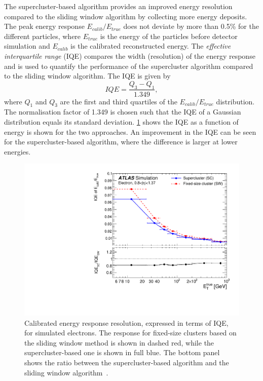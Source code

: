 The supercluster-based algorithm provides an improved energy resolution compared to the sliding window algorithm by collecting more energy deposits. The peak energy response $E_{calib}/E_{true}$ does not deviate by more than 0.5\% for the different particles, where $E_{true}$ is the energy of the particles before detector simulation and $E_{calib}$ is the calibrated reconstructed energy. The \emph{effective interquartile range} (IQE) compares the width (resolution) of the energy response and is used to quantify the performance of the supercluster algorithm compared to the sliding window algorithm. The IQE is given by
\begin{equation}
    IQE = \frac{Q_3 - Q_1}{1.349},
\end{equation}
where $Q_1$ and $Q_3$ are the first and third quartiles of the $E_{calib}/E_{true}$ distribution. The normalisation factor of 1.349 is chosen such that the IQE of a Gaussian distribution equals its standard deviation. \cref{fig:method:iqe} shows the IQE as a function of energy is shown for the two approaches. An improvement in the IQE can be seen for the supercluster-based algorithm, where the difference is larger at lower energies. 
\begin{figure}[h]
    \centering
    \includegraphics[width=\mediumfigwidth]{images/IQE_reco_1.pdf}
    \caption[Calibrated energy response resolution, expressed in terms of IQE, for simulated electrons]{Calibrated energy response resolution, expressed in terms of IQE, for simulated electrons. The response for fixed-size clusters based on the sliding window method is shown in dashed red, while the supercluster-based one is shown in full blue. The bottom panel shows the ratio between the supercluster-based algorithm and the sliding window algorithm~\cite{Aad:2019tso}.}
    \label{fig:method:iqe}
\end{figure}

